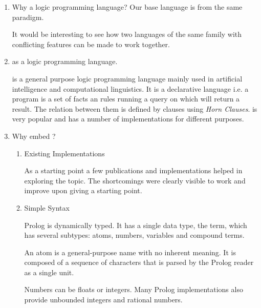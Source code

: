 \documentclass[thesis-solanki.tex]{subfiles}
\begin{document}
\begin{enumerate}
\item Why a logic programming language?
Our base language\yyy{;}{,} \yyy{}{,} is from the same
paradigm.  

It would be interesting to see how two languages of the same family with conflicting features can be made to work together.



\item {} as a logic programming language.

   is a general purpose logic programming language mainly used in artificial intelligence and
  computational linguistics.
  It is a declarative language\yyy{}{\Large,} i.e.\yyy{}{\Large,} a program is a set of facts an rules running a
  query on which will return a result.
  The relation between them is defined by clauses using \textit{Horn Clauses}\cite{wikiprolog}.
   is very popular and has a number of implementations
  \cite{website:comparisonofprologimplementationswiki} for different purposes.

\item Why embed  ?

\begin{enumerate}


\item Existing Implementations

As a starting point a few publications and implementations helped in exploring the topic. The shortcomings were clearly visible to work and
improve upon giving a starting point.

\item Simple Syntax
\cite{wikiprolog}

Prolog is dynamically typed. It has a single data type, the term, which has several subtypes: atoms, numbers, variables and compound terms.

An atom is a general-purpose name with no inherent meaning. It is composed of a sequence of characters that is parsed by the Prolog
reader 
as a single unit.

Numbers can be floats or integers. Many Prolog
 implementations also provide unbounded integers and rational numbers.


\end{enumerate}
\end{enumerate}
\end{document}
